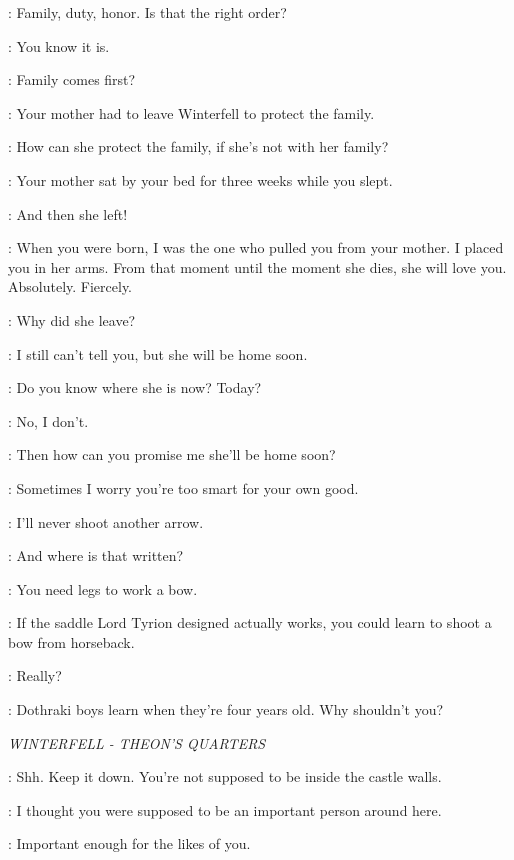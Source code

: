 \BRAN: Family, duty, honor.  Is that the right order? 

\LUWIN: You know it is. 

\BRAN: Family comes first? 

\LUWIN: Your mother had to leave Winterfell to protect the family. 

\BRAN: How can she protect the family, if she's not with her family? 

\LUWIN: Your mother sat by your bed for three weeks while you slept. 

\BRAN: And then she left! 

\LUWIN: When you were born, I was the one who pulled you from your mother. I placed you in her arms. From that moment until the moment she dies, she will love you. Absolutely. Fiercely. 

\BRAN: Why did she leave? 

\LUWIN: I still can't tell you, but she will be home soon. 

\BRAN: Do you know where she is now? Today? 

\LUWIN: No, I don't. 

\BRAN: Then how can you promise me she'll be home soon? 

\LUWIN: Sometimes I worry you're too smart for your own good. 

\BRAN: I'll never shoot another arrow. 

\LUWIN: And where is that written? 

\BRAN: You need legs to work a bow. 

\LUWIN: If the saddle Lord Tyrion designed actually works, you could learn to shoot a bow from horseback. 

\BRAN: Really? 

\LUWIN: Dothraki boys learn when they're four years old. Why shouldn't you? 


\scene

\textit{WINTERFELL - THEON'S QUARTERS} 


\THEON: Shh. Keep it down. You're not supposed to be inside the castle walls. 


\ROS: I thought you were supposed to be an important person around here. 

\THEON: Important enough for the likes of you. 

